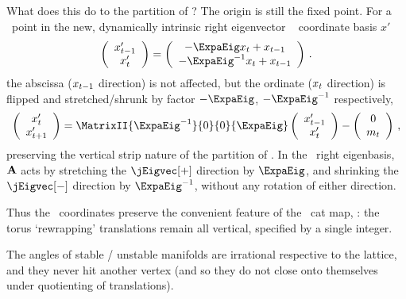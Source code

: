 What does this do to the partition of ? The origin
is still the fixed point. For a \statesp\ point in the new, dynamically
intrinsic right eigenvector \AW\ %
coordinate basis $x'$
\[
\left(\begin{array}{c}
 \ssp_{t-1}'  \\
 \ssp_{t}'
 \end{array} \right )
 =
\left(\begin{array}{c}
 -\ExpaEig\ssp_{t}+\ssp_{t-1}\\
 -\ExpaEig^{-1}\ssp_{t}+\ssp_{t-1}
 \end{array} \right )
\,.
\]
the abscissa ($x_{t-1}$ direction) is not affected, but the ordinate
($x_{t}$ direction) is flipped and stretched/shrunk by factor $-\ExpaEig$,
$-\ExpaEig^{-1}$ respectively,
\[
\left(\begin{array}{c}
 \ssp_{t}'  \\
 \ssp_{t+1}'
 \end{array} \right )
 =
 \MatrixII{\ExpaEig^{-1}}{0}
          {0}            {\ExpaEig}
\left(\begin{array}{c}
 \ssp_{t-1}'  \\
 \ssp_{t}'
 \end{array} \right )
 - \left(\begin{array}{c}
 0  \\
 \Ssym{t}
 \end{array} \right )
\,,
\]
preserving the vertical strip nature of the
partition of . In the \AW\ right eigenbasis,
${\bf A}$ acts by stretching the $\jEigvec[+]$ direction by $\ExpaEig$, and
shrinking the $\jEigvec[-]$ direction by  $\ExpaEig^{-1}$, without any rotation
of either direction.

Thus the \AW\ coordinates preserve the convenient feature of the
\PV\ cat map, : the torus `rewrapping'
translations remain all vertical, specified by a single integer.

The angles of stable / unstable manifolds are irrational respective to the
lattice, and they never hit another vertex (and so they do not close onto
themselves under quotienting of translations).

%
%
%


